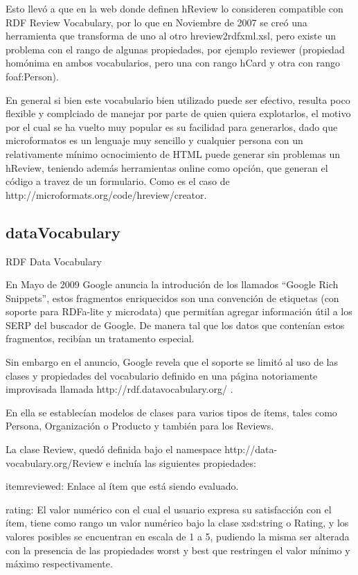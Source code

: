 Esto llevó a que en la web donde definen hReview lo consideren compatible con RDF Review Vocabulary, por lo que en Noviembre de 2007 
se creó una herramienta que transforma de uno al otro hreview2rdfxml.xsl,  pero existe un problema con el rango de algunas 
propiedades, por ejemplo reviewer (propiedad homónima en ambos vocabularios, pero una con rango hCard y otra con rango foaf:Person).

En general si bien este vocabulario bien utilizado puede ser efectivo, resulta poco flexible y complciado de manejar por parte 
de quien quiera explotarlos, el motivo por el cual se ha vuelto muy popular es su facilidad para generarlos, dado que 
microformatos es un lenguaje muy sencillo y cualquier persona con un relativamente mínimo ocnocimiento de HTML puede generar 
sin problemas un hReview, teniendo además herramientas online como opción, que generan el código a travez de un formulario. 
Como es el caso de http://microformats.org/code/hreview/creator. 


\subsection{dataVocabulary}
RDF Data Vocabulary

En Mayo de 2009 Google anuncia la introdución de los llamados ``Google Rich Snippets'', estos fragmentos enriquecidos son una convención 
de etiquetas (con soporte para RDFa-lite y microdata) que permitían agregar información útil a los SERP del buscador de Google. De manera tal 
que los datos que contenían estos fragmentos, recibían un tratamento especial.

Sin embargo en el anuncio, Google revela que el soporte se limitó al uso de las clases y propiedades del vocabulario definido en una página 
notoriamente improvisada llamada http://rdf.datavocabulary.org/ . 

En ella se establecían modelos de clases para varios tipos de ítems, tales como Persona, Organización o Producto y también para los Reviews.

La clase Review, quedó definida bajo el namespace http://data-vocabulary.org/Review e incluía las siguientes propiedades:

itemreviewed: Enlace al ítem que está siendo evaluado.

rating: El valor numérico con el cual el usuario expresa su satisfacción con el ítem, tiene como rango un valor numérico bajo la clase 
xsd:string o Rating, y los valores posibles se encuentran en escala de 1 a 5, pudiendo la misma ser alterada con la presencia de las 
propiedades worst y best que restringen el valor mínimo y máximo respectivamente.

